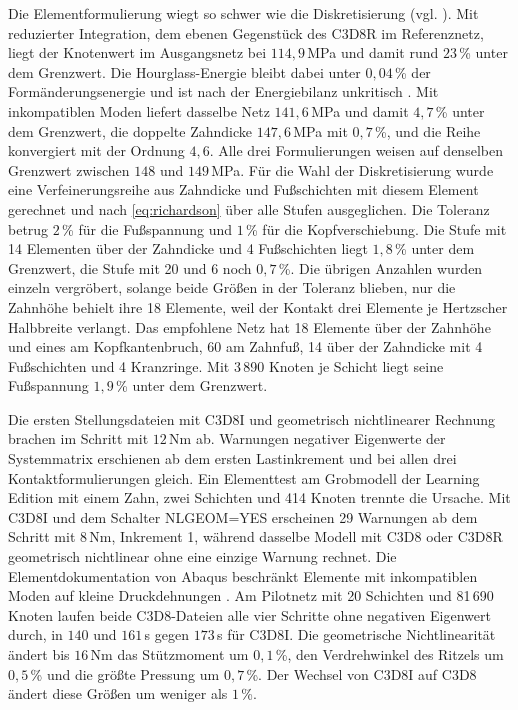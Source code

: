 Die Elementformulierung wiegt so schwer wie die Diskretisierung (vgl. ). Mit reduzierter Integration, dem ebenen Gegenstück des C3D8R im Referenznetz, liegt der Knotenwert im Ausgangsnetz bei $114{,}9$\,MPa und damit rund $23$\,\% unter dem Grenzwert. Die Hourglass-Energie bleibt dabei unter $0{,}04$\,\% der Formänderungsenergie und ist nach der Energiebilanz unkritisch \cite[S.~428]{Sto18}. Mit inkompatiblen Moden liefert dasselbe Netz $141{,}6$\,MPa und damit $4{,}7$\,\% unter dem Grenzwert, die doppelte Zahndicke $147{,}6$\,MPa mit $0{,}7$\,\%, und die Reihe konvergiert mit der Ordnung $4{,}6$. Alle drei Formulierungen weisen auf denselben Grenzwert zwischen $148$ und $149$\,MPa. Für die Wahl der Diskretisierung wurde eine Verfeinerungsreihe aus Zahndicke und Fußschichten mit diesem Element gerechnet und nach \eqref{eq:richardson} über alle Stufen ausgeglichen. Die Toleranz betrug $2$\,\% für die Fußspannung und $1$\,\% für die Kopfverschiebung. Die Stufe mit 14 Elementen über der Zahndicke und 4 Fußschichten liegt $1{,}8$\,\% unter dem Grenzwert, die Stufe mit 20 und 6 noch $0{,}7$\,\%. Die übrigen Anzahlen wurden einzeln vergröbert, solange beide Größen in der Toleranz blieben, nur die Zahnhöhe behielt ihre 18 Elemente, weil der Kontakt drei Elemente je Hertzscher Halbbreite verlangt. Das empfohlene Netz hat 18 Elemente über der Zahnhöhe und eines am Kopfkantenbruch, 60 am Zahnfuß, 14 über der Zahndicke mit 4 Fußschichten und 4 Kranzringe. Mit 3\,890 Knoten je Schicht liegt seine Fußspannung $1{,}9$\,\% unter dem Grenzwert.

Die ersten Stellungsdateien mit C3D8I und geometrisch nichtlinearer Rechnung brachen im Schritt mit $12$\,Nm ab. Warnungen negativer Eigenwerte der Systemmatrix erschienen ab dem ersten Lastinkrement und bei allen drei Kontaktformulierungen gleich. Ein Elementtest am Grobmodell der Learning Edition mit einem Zahn, zwei Schichten und 414 Knoten trennte die Ursache. Mit C3D8I und dem Schalter NLGEOM=YES erscheinen 29 Warnungen ab dem Schritt mit $8$\,Nm, Inkrement 1, während dasselbe Modell mit C3D8 oder C3D8R geometrisch nichtlinear ohne eine einzige Warnung rechnet. Die Elementdokumentation von Abaqus beschränkt Elemente mit inkompatiblen Moden auf kleine Druckdehnungen \cite{AbaqusSolid25}. Am Pilotnetz mit 20 Schichten und 81\,690 Knoten laufen beide C3D8-Dateien alle vier Schritte ohne negativen Eigenwert durch, in $140$ und $161$\,s gegen $173$\,s für C3D8I. Die geometrische Nichtlinearität ändert bis $16$\,Nm das Stützmoment um $0{,}1$\,\%, den Verdrehwinkel des Ritzels um $0{,}5$\,\% und die größte Pressung um $0{,}7$\,\%. Der Wechsel von C3D8I auf C3D8 ändert diese Größen um weniger als $1$\,\%.

